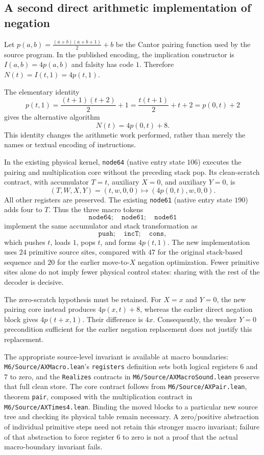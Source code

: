 \subsection{A second direct arithmetic implementation of negation}
Let $p(a,b)=\frac{(a+b)(a+b+1)}2+b$ be the Cantor pairing function
used by the source program. In the published encoding, the implication
constructor is $I(a,b)=4p(a,b)$ and falsity has code $1$. Therefore
$N(t)=I(t,1)=4p(t,1)$.

The elementary identity
\[
 p(t,1)=\frac{(t+1)(t+2)}2+1
       =\frac{t(t+1)}2+t+2=p(0,t)+2
\]
gives the alternative algorithm
\[
        N(t)=4p(0,t)+8.
\]
This identity changes the arithmetic work performed, rather than merely the
names or textual encoding of instructions.

In the existing physical kernel, \texttt{node64} (native entry state $106$)
executes the pairing and multiplication core without the preceding stack
pop. Its clean-scratch contract, with accumulator $T=t$, auxiliary $X=0$,
and auxiliary $Y=0$, is
\[
 (T,W,X,Y)=(t,w,0,0)
   \longmapsto (4p(0,t),w,0,0).
\]
All other registers are preserved. The existing \texttt{node61}
(native entry state $190$) adds four to $T$. Thus the three macro tokens
\[
 \texttt{node64};\quad \texttt{node61};\quad \texttt{node61}
\]
implement the same accumulator and stack transformation as
\[
 \texttt{push};\quad\texttt{incT};\quad\texttt{cons},
\]
which pushes $t$, loads $1$, pops $t$, and forms $4p(t,1)$.
The new implementation uses $24$ primitive source sites, compared with
$47$ for the original stack-based sequence and $20$ for the earlier
move-to-$X$ negation optimization. Fewer primitive sites alone do not
imply fewer physical control states: sharing with the rest of the decoder
is decisive.

The zero-scratch hypothesis must be retained. For $X=x$ and $Y=0$, the
new pairing core instead produces $4p(x,t)+8$, whereas the earlier direct
negation block gives $4p(t+x,1)$. Their difference is $4x$.
Consequently, the weaker $Y=0$ precondition sufficient for the earlier
negation replacement does not justify this replacement.

The appropriate source-level invariant is available at macro boundaries:
\texttt{M6/Source/AXMacro.lean}'s \texttt{registers} definition sets both
logical registers $6$ and $7$ to zero, and the \texttt{Realizes} contracts
in \texttt{M6/Source/AXMacroSound.lean} preserve that full clean store.
The core contract follows from \texttt{M6/Source/AXPair.lean}, theorem
\texttt{pair}, composed with the multiplication contract in
\texttt{M6/Source/AXTimes4.lean}. Binding the moved blocks to a particular
new source tree and checking its physical table remain necessary.
A zero/positive abstraction of individual primitive steps need not retain
this stronger macro invariant; failure of that abstraction to force
register $6$ to zero is not a proof that the actual macro-boundary invariant
fails.

